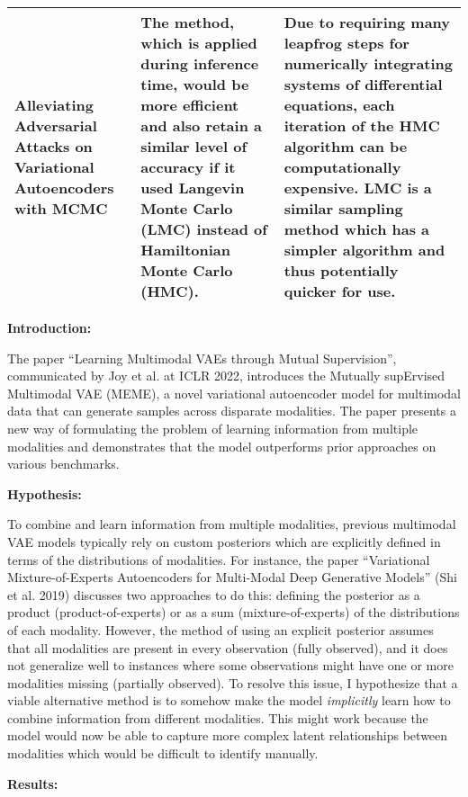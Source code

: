 \documentclass{article}
\begin{document}
\begin{table}[ht]
\begin{tabularx}{\textwidth}{p{3.3cm}XX}
    Alleviating Adversarial Attacks on Variational Autoencoders with MCMC &
    The method, which is applied during inference time, would be more efficient and also retain a similar level of accuracy if it used Langevin Monte Carlo (LMC) instead of Hamiltonian Monte Carlo (HMC). &
    Due to requiring many leapfrog steps for numerically integrating systems of differential equations, each iteration of the HMC algorithm can be computationally expensive. LMC is a similar sampling method which has a simpler algorithm and thus potentially quicker for use. \\ \bottomrule
\end{tabularx}
\end{table}

\clearpage

\textbf{Introduction:}

The paper ``Learning Multimodal VAEs through Mutual Supervision'', communicated by Joy et al. at ICLR 2022, introduces the Mutually supErvised Multimodal VAE (MEME), a novel variational autoencoder model for multimodal data that can generate samples across disparate modalities. The paper presents a new way of formulating the problem of learning information from multiple modalities and demonstrates that the model outperforms prior approaches on various benchmarks.

\textbf{Hypothesis:}

To combine and learn information from multiple modalities, previous multimodal VAE models typically rely on custom posteriors which are explicitly defined in terms of the distributions of modalities. For instance, the paper ``Variational Mixture-of-Experts Autoencoders for Multi-Modal Deep Generative Models'' (Shi et al. 2019) discusses two approaches to do this: defining the posterior as a product (product-of-experts) or as a sum (mixture-of-experts) of the distributions of each modality. However, the method of using an explicit posterior assumes that all modalities are present in every observation (fully observed), and it does not generalize well to instances where some observations might have one or more modalities missing (partially observed). To resolve this issue, I hypothesize that a viable alternative method is to somehow make the model \textit{implicitly} learn how to combine information from different modalities. This might work because the model would now be able to capture more complex latent relationships between modalities which would be difficult to identify manually.

\textbf{Results:}
\end{document}
